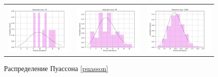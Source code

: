 \documentclass[a4paper]{article}
\begin{document}
	\begin{figure}[H]
		\centering
		\begin{tabular}{ccc}
			\includegraphics[width=55mm, height =0.25\textheight]{poisson_10.png}
			&
			\includegraphics[width=55mm, height =0.25\textheight]{poisson_50.png}
			&
			\includegraphics[width=55mm, height =0.25\textheight]{poisson_1000.png}
		\end{tabular}
		\caption{Распределение Пуассона \eqref{puasson}}
		\label{fig:poisson}
	\end{figure}
\end{document}
